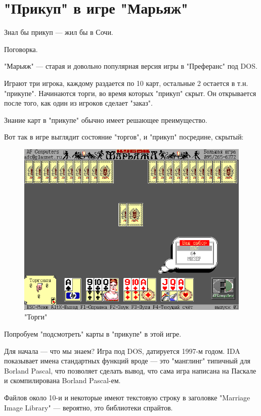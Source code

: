 \chapter{"Прикуп" в игре "Марьяж"}

\epigraph{Знал бы прикуп --- жил бы в Сочи.}{Поговорка.}

"Марьяж" --- старая и довольно популярная версия игры в "Преферанс" под DOS.

Играют три игрока, каждому раздается по 10 карт, остальные 2 остается в т.н. "прикупе".
Начинаются торги, во время которых "прикуп" скрыт.
Он открывается после того, как один из игроков сделает "заказ".

Знание карт в "прикупе" обычно имеет решающее преимущество.

Вот так в игре выглядит состояние "торгов", и "прикуп" посредине, скрытый:

\begin{figure}[H]
\centering
\includegraphics[scale=\FigScale]{examples/marriage/initial_not_patched.png}
\caption{"Торги"}
\end{figure}

Попробуем "подсмотреть" карты в "прикупе" в этой игре.

Для начала --- что мы знаем?
Игра под DOS, датируется 1997-м годом. IDA показывает имена стандартных функций вроде 
 --- это "манглинг" типичный для Borland Pascal, что позволяет сделать вывод,
что сама игра написана на Паскале и скомпилирована Borland Pascal-ем.

Файлов около 10-и и некоторые имеют текстовую строку в заголовке "Marriage Image Library" --- вероятно,
это библиотеки спрайтов.

